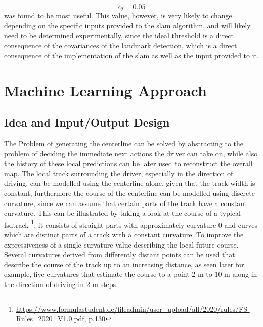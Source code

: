 $$c_\theta = 0.05$$
was found to be most useful. This value, however, is very likely to change depending on the specific inputs provided to the \ac{slam} algorithm, and will likely need to be determined experimentally, since the ideal threshold is a direct consequence of the covariances of the landmark detection, which is a direct consequence of the implementation of the \ac{slam} as well as the input provided to it.


\section{Machine Learning Approach}
\subsection{Idea and Input/Output Design}
The Problem of generating the centerline can be solved by abstracting to the problem of deciding the immediate next actions the driver can take on, while also the history of these local predictions can be later used to reconstruct the overall map. The local track surrounding the driver, especially in the direction of driving, can be modelled using the centerline alone, given that the track width is constant, furthermore the course of the centerline can be modelled using discrete curvature, since we can assume that certain parts of the track have a constant curvature. This can be illustrated by taking a look at the course of a typical \ac{fsd}track \footnote{\url{https://www.formulastudent.de/fileadmin/user_upload/all/2020/rules/FS-Rules_2020_V1.0.pdf}, p.130}: it consists of straight parts with approximately curvature 0 and curves which are distinct parts of a track with a constant curvature. To improve the expressiveness of a single curvature value describing the local future course. Several curvatures derived from differently distant points can be used that describe the course of the track up to an increasing distance, as seen later for example, five curvatures that estimate the course to a point 2 m to 10 m along in the direction of driving in 2 m steps.


